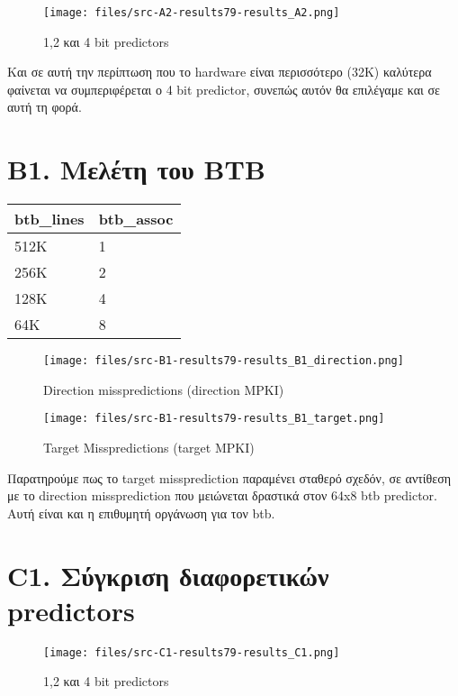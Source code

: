 \documentclass[a4paper,12pt]{article}
\begin{document}
\begin{figure}[H]
	\centering
	\texttt{[image: files/src-A2-results79-results\_A2.png]}
	\caption{1,2 και 4 bit predictors}
	\label{fig:A2}
\end{figure}

Και σε αυτή την περίπτωση που το hardware είναι περισσότερο (32K) καλύτερα
φαίνεται να συμπεριφέρεται ο 4 bit predictor, συνεπώς αυτόν θα επιλέγαμε και
σε αυτή τη φορά.



\section*{B1. Μελέτη του BTB}

\begin{tabular}{l l}
	btb\_lines & btb\_assoc \\
	\hline
	\hline
	512K & 1 \\
	256K & 2 \\
	128K & 4 \\
	64K  & 8 \\

\end{tabular}

\begin{figure}[H]
	\centering
	\texttt{[image: files/src-B1-results79-results\_B1\_direction.png]}
	\caption{Direction misspredictions (direction MPKI)}
\end{figure}

\begin{figure}[H]
	\centering
	\texttt{[image: files/src-B1-results79-results\_B1\_target.png]}
	\caption{Target Misspredictions (target MPKI)}
\end{figure}


Παρατηρούμε πως το target missprediction παραμένει σταθερό σχεδόν, σε αντίθεση
με το direction missprediction που μειώνεται δραστικά στον 64x8 btb predictor.
Αυτή είναι και η επιθυμητή οργάνωση για τον btb.

%

\section*{C1. Σύγκριση διαφορετικών predictors}
\begin{figure}[H]
	\centering
	\texttt{[image: files/src-C1-results79-results\_C1.png]}
	\caption{1,2 και 4 bit predictors}
	\label{fig:A2}
\end{figure}
\end{document}
